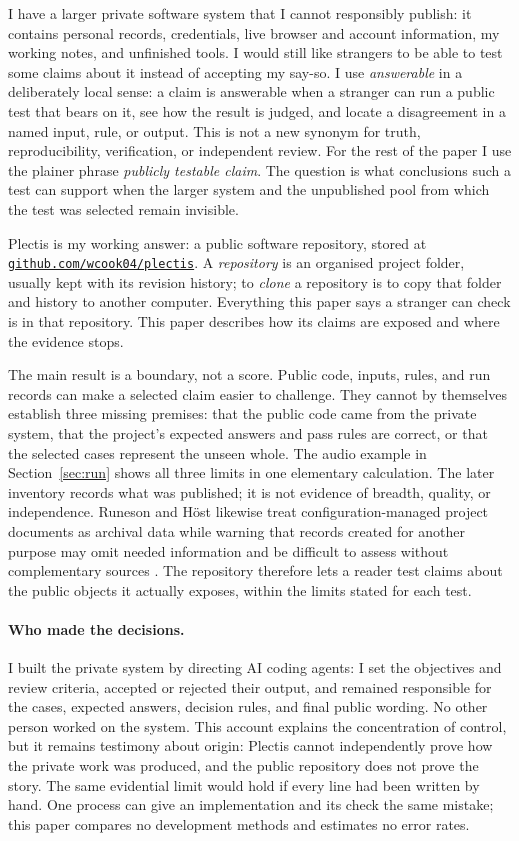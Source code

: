 \documentclass[11pt]{article}
\newcommand{\repo}{\href{https://github.com/wcook04/plectis}{\nolinkurl{github.com/wcook04/plectis}}}
\begin{document}
I have a larger private software system that I cannot responsibly publish:
it contains personal records, credentials, live browser and account
information, my working notes, and unfinished tools. I would still like
strangers to be able to test some claims about it instead of accepting my
say-so. I use \emph{answerable} in a deliberately local sense: a claim is
answerable when a stranger can run a public test that bears on it, see how the
result is judged, and locate a disagreement in a named input, rule, or output.
This is not a new synonym for truth, reproducibility, verification, or
independent review. For the rest of the paper I use the plainer phrase
\emph{publicly testable claim}. The question is what conclusions such a test
can support when the larger system and the unpublished pool from which the
test was selected remain invisible.

Plectis is my working answer: a public software repository, stored at
\repo. A \emph{repository} is an organised project folder, usually kept
with its revision history; to \emph{clone} a repository is to copy that
folder and history to another computer. Everything this paper says a
stranger can check is in that repository. This paper describes how its
claims are exposed and where the evidence stops.

The main result is a boundary, not a score. Public code, inputs, rules, and
run records can make a selected claim easier to challenge. They cannot by
themselves establish three missing premises: that the public code came from
the private system, that the project's expected answers and pass rules are
correct, or that the selected cases represent the unseen whole. The audio
example in Section~\ref{sec:run} shows all three limits in one elementary
calculation. The later inventory records what was published; it is not
evidence of breadth, quality, or independence.
Runeson and H\"ost likewise treat configuration-managed project documents as
archival data while warning that records created for another purpose may omit
needed information and be difficult to assess without complementary sources
\cite[\S4.4, p.~148]{runeson2009}.
The repository therefore lets a reader test claims about the public objects it
actually exposes, within the limits stated for each test.

\paragraph{Who made the decisions.}
I built the private system by directing AI coding agents: I set the objectives
and review criteria, accepted or rejected their output, and remained
responsible for the cases, expected answers, decision rules, and final public
wording.  No other person worked on the system.  This account explains the
concentration of control, but it remains testimony about origin: Plectis
cannot independently prove how the private work was produced, and the public
repository does not prove the story.  The same evidential limit would hold if
every line had been written by hand.  One process can give an implementation
and its check the same mistake; this paper compares no development methods and
estimates no error rates.
\end{document}
